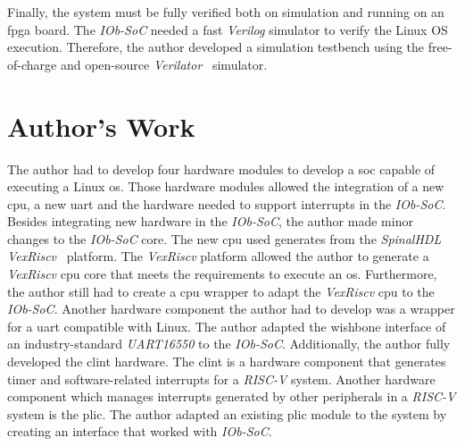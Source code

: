 Finally, the system must be fully verified both on simulation and running on an \acrshort{fpga} board. The \textit{IOb-SoC} needed a fast \textit{Verilog} simulator to verify the Linux OS execution. Therefore, the author developed a simulation testbench using the free-of-charge and open-source \textit{Verilator}~\cite{snyder2010verilator} simulator.

\section{Author's Work}
\label{section:authors_work}
The author had to develop four hardware modules to develop a \acrfull{soc} capable of executing a Linux \acrshort{os}. Those hardware modules allowed the integration of a new \acrshort{cpu}, a new \acrshort{uart} and the hardware needed to support interrupts in the \textit{IOb-SoC}. Besides integrating new hardware in the \textit{IOb-SoC}, the author made minor changes to the \textit{IOb-SoC} core. The new \acrshort{cpu} used generates from the \textit{SpinalHDL}~\cite{papon2017spinalhdl} \textit{VexRiscv}~\cite{vexriscv} platform. The \textit{VexRiscv} platform allowed the author to generate a \textit{VexRiscv} \acrshort{cpu} core that meets the requirements to execute an \acrlong{os}. Furthermore, the author still had to create a \acrshort{cpu} wrapper to adapt the \textit{VexRiscv} \acrshort{cpu} to the \textit{IOb-SoC}. Another hardware component the author had to develop was a wrapper for a \acrshort{uart} compatible with Linux. The author adapted the wishbone interface of an industry-standard \textit{UART16550} to the \textit{IOb-SoC}. Additionally, the author fully developed the \acrshort{clint} hardware. The \acrshort{clint} is a hardware component that generates timer and software-related interrupts for a \textit{RISC-V} system. Another hardware component which manages interrupts generated by other peripherals in a \textit{RISC-V} system is the \acrshort{plic}. The author adapted an existing \acrshort{plic} module to the system by creating an interface that worked with \textit{IOb-SoC}.

